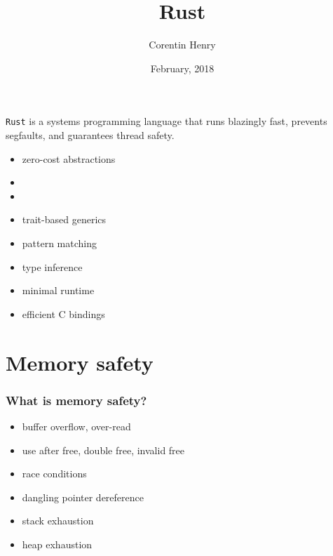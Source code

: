 \documentclass{beamer}
\begin{document}
{%
		
    \title{Rust}
    \author{Corentin Henry}
    \date{February, 2018}
    \frame{\titlepage}
}
\addtocounter{framenumber}{-2}

\begin{frame}
    \begin{center}
        \texttt{Rust} is a systems programming language that runs blazingly fast, prevents segfaults, and guarantees thread safety. 
    \end{center}
\end{frame}


\begin{frame}
    \begin{itemize}
        \item zero-cost abstractions
        \item {}
        \item {}
        \item trait-based generics
        \item pattern matching
        \item type inference
        \item minimal runtime
        \item efficient C bindings
    \end{itemize}
\end{frame}

\section{Memory safety}

\begin{frame}
    \frametitle{What is memory safety?}
    \begin{itemize}
        \item buffer overflow, over-read
        \item use after free, double free, invalid free
        \item race conditions
        \item dangling pointer dereference
        \item stack exhaustion
        \item heap exhaustion
    \end{itemize}
\end{frame}
\end{document}
